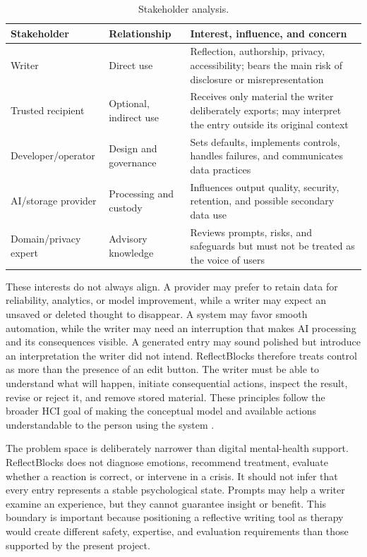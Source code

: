 \documentclass[sigconf,nonacm]{acmart}
\begin{document}
\begin{table}[tb]
  \caption{Stakeholder analysis.}
  \label{tab:stakeholders}
  \begin{tabularx}{\textwidth}{@{}l l X@{}}
    \toprule
    Stakeholder & Relationship & Interest, influence, and concern \\
    \midrule
    Writer & Direct use & Reflection, authorship, privacy, accessibility; bears the main risk of disclosure or misrepresentation \\
    Trusted recipient & Optional, indirect use & Receives only material the writer deliberately exports; may interpret the entry outside its original context \\
    Developer/operator & Design and governance & Sets defaults, implements controls, handles failures, and communicates data practices \\
    AI/storage provider & Processing and custody & Influences output quality, security, retention, and possible secondary data use \\
    Domain/privacy expert & Advisory knowledge & Reviews prompts, risks, and safeguards but must not be treated as the voice of users \\
    \bottomrule
  \end{tabularx}
\end{table}

These interests do not always align. A provider may prefer to retain data for
reliability, analytics, or model improvement, while a writer may expect an
unsaved or deleted thought to disappear. A system may favor smooth automation,
while the writer may need an interruption that makes AI processing and its
consequences visible. A generated entry may sound polished but introduce an
interpretation the writer did not intend. ReflectBlocks therefore treats
control as more than the presence of an edit button. The writer must be able to
understand what will happen, initiate consequential actions, inspect the result,
revise or reject it, and remove stored material. These principles follow the
broader HCI goal of making the conceptual model and available actions
understandable to the person using the system \cite{norman2013design}.

The problem space is deliberately narrower than digital mental-health support.
ReflectBlocks does not diagnose emotions, recommend treatment, evaluate whether
a reaction is correct, or intervene in a crisis. It should not infer that every
entry represents a stable psychological state. Prompts may help a writer examine
an experience, but they cannot guarantee insight or benefit. This boundary is
important because positioning a reflective writing tool as therapy would create
different safety, expertise, and evaluation requirements than those supported
by the present project.
\end{document}
